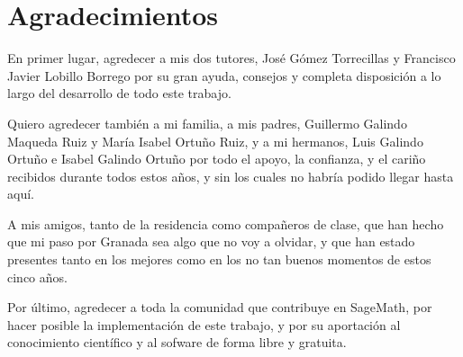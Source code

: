 

\chapter{Agradecimientos}

En primer lugar, agredecer a mis dos tutores, José Gómez Torrecillas y Francisco
Javier Lobillo Borrego por su gran ayuda, consejos y completa disposición a lo
largo del desarrollo de todo este trabajo.

Quiero agredecer también a mi familia, a mis padres, Guillermo Galindo Maqueda
Ruiz y María Isabel Ortuño Ruiz, y a mi hermanos, Luis Galindo Ortuño e Isabel
Galindo Ortuño por todo el apoyo, la confianza, y el cariño recibidos durante todos
estos años, y sin los cuales no habría podido llegar hasta aquí.

A mis amigos, tanto de la residencia como compañeros de clase, que han hecho
que mi paso por Granada sea algo que no voy a olvidar, y que han estado presentes
tanto en los mejores como en los no tan buenos momentos de estos cinco años.

Por último, agredecer a toda la comunidad que contribuye en SageMath, por hacer posible
la implementación de este trabajo, y por su aportación al conocimiento científico y al
sofware de forma libre y gratuita.
\cleardoublepage
\endinput
